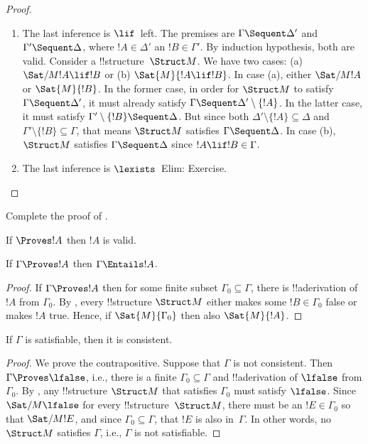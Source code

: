 \documentclass[../../include/open-logic-section]{subfiles}
\begin{document}
\begin{proof}
\begin{enumerate}
\item The last inference is $\lif$~left.  The premises are $\Gamma
  \Sequent \Delta'$ and $\Gamma' \Sequent \Delta$, where $!A \in
  \Delta'$ an $!B \in \Gamma'$.  By induction hypothesis, both are
  valid.  Consider a !!{structure}~$\Struct M$.  We have two cases:
  (a) $\Sat/{M}{!A \lif !B}$ or (b) $\Sat{M}{!A \lif !B}$.  In case
  (a), either $\Sat/{M}{!A}$ or $\Sat{M}{!B}$.  In the former case, in
  order for $\Struct M$ to satisfy $\Gamma \Sequent \Delta'$, it must
  already satisfy $\Gamma \Sequent \Delta' \setminus \{!A\}$.  In the
  latter case, it must satisfy $\Gamma' \setminus \{!B\} \Sequent
  \Delta$.  But since both $\Delta' \setminus \{!A\} \subseteq \Delta$
  and $\Gamma' \setminus \{!B\} \subseteq \Gamma$, that means $\Struct
  M$ satisfies $\Gamma \Sequent \Delta$.  In case (b), $\Struct M$
  satisfies $\Gamma \Sequent \Delta$ since $!A \lif !B \in \Gamma$.
  
    
\item The last inference is $\lexists$~Elim: Exercise.
\end{enumerate}
\end{proof}

\begin{prob}
Complete the proof of .
\end{prob}

\begin{cor}
If $\Proves !A$ then $!A$ is valid.
\end{cor}

\begin{cor}
If $\Gamma \Proves !A$ then $\Gamma \Entails !A$.
\end{cor}

\begin{proof}
If $\Gamma \Proves !A$ then for some finite subset $\Gamma_0 \subseteq
\Gamma$, there is !!a{derivation} of $!A$ from $\Gamma_0$.  By
, every !!{structure} $\Struct M$ either
makes some $!B \in \Gamma_0$ false or makes $!A$ true.  Hence, if
$\Sat{M}{\Gamma_0}$ then also $\Sat{M}{!A}$.
\end{proof}

\begin{cor}
If $\Gamma$ is satisfiable, then it is consistent.
\end{cor}

\begin{proof}
We prove the contrapositive.  Suppose that $\Gamma$ is not
consistent.  Then $\Gamma \Proves \lfalse$, i.e., there is a finite
$\Gamma_0 \subseteq \Gamma$ and !!a{derivation} of $\lfalse$
from $\Gamma_0$. By , any !!{structure} 
$\Struct M$ that satisfies $\Gamma_0$ must satisfy $\lfalse$.  
Since $\Sat/{M}{\lfalse}$ for every !!{structure}~$\Struct M$,
there must be an $!E \in \Gamma_0$ so that $\Sat/{M}{!E}$, 
and since $\Gamma_0 \subseteq \Gamma$, that $!E$ is also
in~$\Gamma$.  In other words, no $\Struct M$ satisfies $\Gamma$, 
i.e., $\Gamma$ is not satisfiable.
\end{proof}
\end{document}
